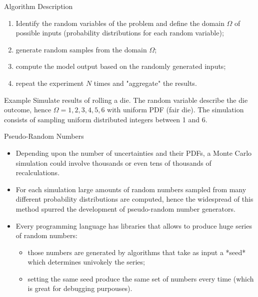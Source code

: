\documentclass{beamer}
\begin{document}
\begin{frame}{Algorithm Description}
    \begin{enumerate}
    \item Identify the random variables of the problem and define the domain $\Omega$ of possible inputs (probability distributions for each random variable);
    \item generate random samples from the domain $\Omega$;
    \item compute the model output based on the randomly generated inputs;
    \item repeat the experiment $N$ times and "aggregate" the results.
    \end{enumerate}
    \begin{block}{Example}
    Simulate results of rolling a die. The random variable describe the die outcome, hence $\Omega = {1,2,3,4,5,6}$ with uniform PDF (fair die).
    The simulation consists of sampling uniform distributed integers between 1 and 6.
    \end{block}
\end{frame}

\begin{frame}{Pseudo-Random Numbers}
    \begin{itemize}
    \item  Depending upon the number of uncertainties and their PDFs, a Monte Carlo simulation could involve thousands or even tens of thousands of recalculations.
    \item For each simulation large amounts of random numbers sampled from many different probability distributions are computed, hence the widespread of this method spurred the development of pseudo-random number generators. 
    \item Every programming language has libraries that allows to produce huge series of random numbers:
    \begin{itemize}
        \item those numbers are generated by algorithms that take as input a *seed* which determines univokely the series; 
        \item setting the same seed produce the same set of numbers every time (which is great for debugging purpouses).
    \end{itemize}
    \end{itemize}
\end{frame}
\end{document}
